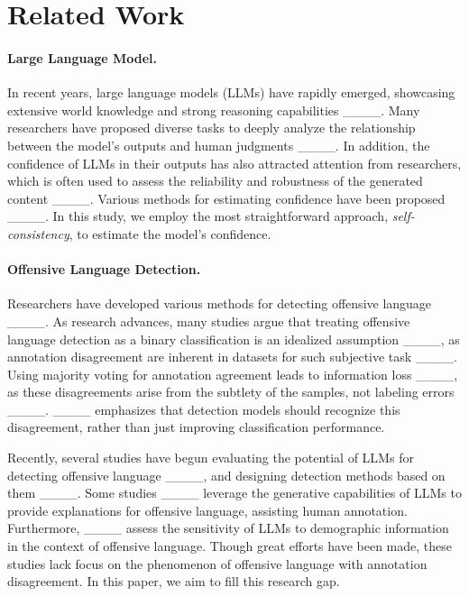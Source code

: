 \section{Related Work}
\paragraph{Large Language Model.}
In recent years, large language models (LLMs) have rapidly emerged, showcasing extensive world knowledge and strong reasoning capabilities ____. 
Many researchers have proposed diverse tasks to deeply analyze the relationship between the model's outputs and human judgments ____.
In addition, the confidence of LLMs in their outputs has also attracted attention from researchers, which is often used to assess the reliability and robustness of the generated content ____.
Various methods for estimating confidence have been proposed ____. 
In this study, we employ the most straightforward approach, \textit{self-consistency}, to estimate the model’s confidence.


\paragraph{Offensive Language Detection.}
Researchers have developed various methods for detecting offensive language ____.
As research advances, many studies argue that treating offensive language detection as a binary classification is an idealized assumption ____, as annotation disagreement are inherent in datasets for such subjective task ____. 
Using majority voting for annotation agreement leads to information loss ____, as these disagreements arise from the subtlety of the samples, not labeling errors ____. 
____ emphasizes that detection models should recognize this disagreement, rather than just improving classification performance.


Recently, several studies have begun evaluating the potential of LLMs for detecting offensive language ____, and designing detection methods based on them ____. 
Some studies ____ leverage the generative capabilities of LLMs to provide explanations for offensive language, assisting human annotation. 
Furthermore, ____ assess the sensitivity of LLMs to demographic information in the context of offensive language.
Though great efforts have been made, these studies lack focus on the phenomenon of offensive language with annotation disagreement.
In this paper, we aim to fill this research gap.